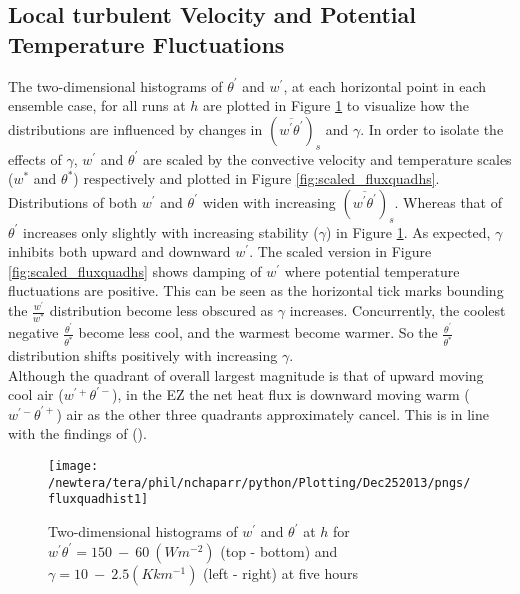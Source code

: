 \clearpage

\subsection{Local turbulent Velocity and Potential Temperature Fluctuations}
\label{subsec:fluxquadrants}     
\FloatBarrier

The two-dimensional histograms of $\theta^{'}$ and $w^{'}$, at each horizontal point in each ensemble case, for all runs at $h$ are plotted in Figure \ref{fig:fluxquadsh} to visualize how the distributions are influenced by changes in $(\overline{w^{'} \theta^{'}})_{s}$ and $\gamma$.  In order to isolate the effects of $\gamma$,  $w^{'}$ and $\theta^{'}$ are scaled by the convective velocity and temperature scales ($w^{*}$ and $\theta^{*}$) respectively and plotted in Figure \ref{fig:scaled_fluxquadhs}.\\

Distributions of both $w^{'}$ and $\theta^{'}$ widen with increasing $(\overline{w^{'}\theta^{'}})_{s}$.  Whereas that of $\theta^{'}$ increases only slightly with increasing stability ($\gamma$) in Figure \ref{fig:fluxquadsh}.  As expected, $\gamma$ inhibits both upward and downward $w^{'}$. The scaled version in Figure \ref{fig:scaled_fluxquadhs} shows damping of $w^{'}$ where potential temperature fluctuations are positive.  This can be seen as the horizontal tick marks bounding the $\frac{w^{'}}{w^{*}}$ distribution become less obscured as $\gamma$ increases.  Concurrently, the coolest negative $\frac{\theta^{'}}{\theta^{*}}$ become less cool, and the warmest become warmer.  So the $\frac{\theta^{'}}{\theta^{*}}$ distribution shifts positively with increasing $\gamma$.\\ 

Although the quadrant of overall largest magnitude is that of upward moving cool air ($w^{'+}\theta^{'-}$), in the \acs{EZ} the net heat flux is downward moving warm ($w^{'-}\theta^{'+}$) air as the other three quadrants approximately cancel.  This is in line with the findings of \citeauthor{SullMoengStev} (\citeyear{SullMoengStev}). \\


\begin{figure}[htbp]
\centering
 \texttt{[image: /newtera/tera/phil/nchaparr/python/Plotting/Dec252013/pngs/fluxquadhist1]}                 
\caption[Two-dimensional distributions of $w^{'}$ and $\theta^{'}$ for all runs]{Two-dimensional histograms of $w^{'}$ and $\theta^{'}$ at $h$ for $w^{'}\theta^{'} = 150 \ - \ 60\ (Wm^{-2})$ (top - bottom) and $\gamma = 10 \ - \  2.5 (Kkm^{-1})$ (left - right) at five hours}
\label{fig:fluxquadsh}
\end{figure}

